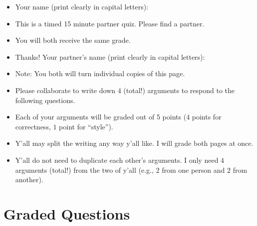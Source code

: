 \documentclass{ccg-topic}
\author{Colton Grainger}
\date{\today}
\begin{document}
\maketitle

\begin{itemize}
    \item Your name (print clearly in capital letters): \underline{\hspace{8cm}}
    \item This is a timed 15 minute partner quiz.  Please find a partner. 
    \item You will both receive the same grade.
    \item Thanks! Your partner's name (print clearly in capital letters): \underline{\hspace{6cm}}
    \item Note: You both will turn individual copies of this page.
    \item Please collaborate to write down $4$ (total!) arguments to respond to the following questions. 
    \item Each of your arguments will be graded out of 5 points ($4$ points for correctness, $1$ point for ``style''). 
    \item Y'all may split the writing any way y'all like. I will grade both pages at once. 
    \item Y'all do not need to duplicate each other's arguments. I only need $4$ arguments (total!) from the two of y'all (e.g., $2$ from one person and $2$ from another).
\end{itemize}



\section*{Graded Questions}
\end{document}
